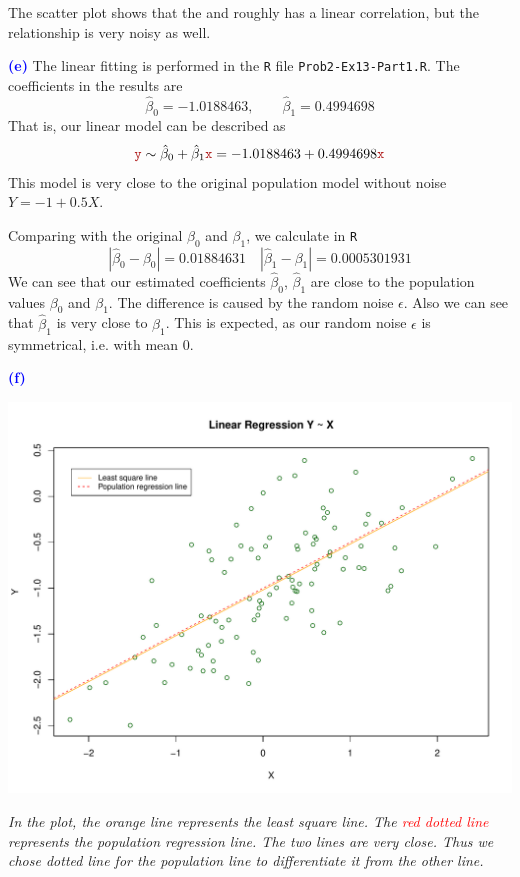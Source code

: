 \documentclass[a4paper,12pt]{article}
\newcommand{\code}[1]{\texttt{#1}}
\newcommand{\qnum}[1]{\noindent\textcolor{blue}{\textbf{(#1)}}}
\begin{document}
The scatter plot shows that the \xr and \yr roughly has a linear correlation, but the relationship is very noisy as well.\bigskip


\qnum{e}
The linear fitting is performed in the \code{R} file \code{Prob2-Ex13-Part1.R}.
The coefficients in the results are
\[
    \hat\beta_0 = -1.0188463,\qquad 
    \hat\beta_1 = 0.4994698
\]
That is, our linear model can be described as 
\[
    \yr \sim \hat\beta_0 + \hat\beta_1\xr 
    = -1.0188463 + 0.4994698\xr
\]
This model is very close to the original population model without noise $Y = -1 + 0.5X$.

Comparing with the original $\beta_0$ and $\beta_1$, we calculate in \code{R}
\[
    |\hat\beta_0 - \beta_0| = 0.01884631 \quad 
    |\hat\beta_1 - \beta_1| = 0.0005301931
\]
We can see that our estimated coefficients $\hat\beta_0$, $\hat\beta_1$ are close to the population values $\beta_0$ and $\beta_1$. The difference is caused by the random noise $\epsilon$. 
Also we can see that $\hat\beta_1$ is very close to $\beta_1$. This is expected, as our random noise $\epsilon$ is symmetrical, i.e. with mean 0.
\bigskip


\qnum{f}
\begin{center}
    \includegraphics[width=0.9\linewidth]{Images/Prob2-Ex13-f.pdf}
    
    \parbox{0.65\textwidth}{\textit{In the plot, the \textcolor{myorange}{orange line} represents the least square line. The \textcolor{red}{red dotted line} represents the population regression line. The two lines are very close. Thus we chose dotted line for the population line to differentiate it from the other line.
    }}
\end{center}
\bigskip
\end{document}
